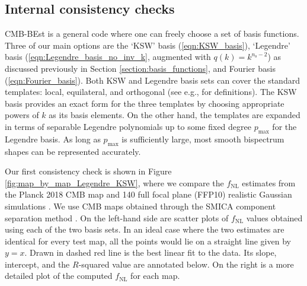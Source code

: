 \subsection{Internal consistency checks} \label{section:internal_consistency}

CMB-BEst is a general code where one can freely choose a set of basis functions. Three of our main options are the `KSW' basis (\ref{eqn:KSW_basis}), `Legendre' basis (\ref{eqn:Legendre_basis_no_inv_k}, augmented with $q(k)=k^{n_\text{s}-2}$) as discussed previously in Section \ref{section:basis_functions}, and Fourier basis (\ref{eqn:Fourier_basis}). Both KSW and Legendre basis sets can cover the standard templates: local, equilateral, and orthogonal (see e.g., \cite{PlanckCollaboration2013} for definitions). The KSW basis provides an exact form for the three templates by choosing appropriate powers of $k$ as its basis elements. On the other hand, the templates are expanded in terms of separable Legendre polynomials up to some fixed degree $p_\text{max}$ for the Legendre basis. As long as $p_\text{max}$ is sufficiently large, most smooth bispectrum shapes can be represented accurately. 

Our first consistency check is shown in Figure \ref{fig:map_by_map_Legendre_KSW}, where we compare the $f_\text{NL}$ estimates from the Planck 2018 CMB map and 140 full focal plane (FFP10) realistic Gaussian simulations \cite{PlanckCollaboration2015simulations}. We use CMB maps obtained through the SMICA component separation method \cite{Cardoso2008component, PlanckCollaboration2013ComponentSeparation}. On the left-hand side are scatter plots of $f_\text{NL}$ values obtained using each of the two basis sets. In an ideal case where the two estimates are identical for every test map, all the points would lie on a straight line given by $y=x$. Drawn in dashed red line is the best linear fit to the data. Its slope, intercept, and the $R$-squared value are annotated below. On the right is a more detailed plot of the computed $f_\text{NL}$ for each map.

